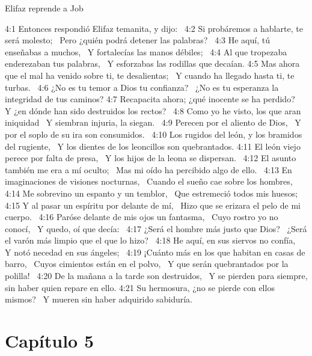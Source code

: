 Elifaz reprende a Job  

4:1 Entonces respondió Elifaz temanita, y dijo:  
4:2 Si probáremos a hablarte, te será molesto;  
Pero ¿quién podrá detener las palabras?  
4:3 He aquí, tú enseñabas a muchos,  
Y fortalecías las manos débiles;  
4:4 Al que tropezaba enderezaban tus palabras,  
Y esforzabas las rodillas que decaían. 
4:5 Mas ahora que el mal ha venido sobre ti, te desalientas;  
Y cuando ha llegado hasta ti, te turbas.  
4:6 ¿No es tu temor a Dios tu confianza?  
¿No es tu esperanza la integridad de tus caminos? 
4:7 Recapacita ahora; ¿qué inocente se ha perdido?  
Y ¿en dónde han sido destruidos los rectos?  
4:8 Como yo he visto, los que aran iniquidad  
Y siembran injuria, la siegan.  
4:9 Perecen por el aliento de Dios,  
Y por el soplo de su ira son consumidos.  
4:10 Los rugidos del león, y los bramidos del rugiente,  
Y los dientes de los leoncillos son quebrantados. 
4:11 El león viejo perece por falta de presa,  
Y los hijos de la leona se dispersan.  
4:12 El asunto también me era a mí oculto;  
Mas mi oído ha percibido algo de ello.  
4:13 En imaginaciones de visiones nocturnas,  
Cuando el sueño cae sobre los hombres,  
4:14 Me sobrevino un espanto y un temblor,  
Que estremeció todos mis huesos;  
4:15 Y al pasar un espíritu por delante de mí,  
Hizo que se erizara el pelo de mi cuerpo.  
4:16 Paróse delante de mis ojos un fantasma,  
Cuyo rostro yo no conocí,  
Y quedo, oí que decía:  
4:17 ¿Será el hombre más justo que Dios?  
¿Será el varón más limpio que el que lo hizo?  
4:18 He aquí, en sus siervos no confía,  
Y notó necedad en sus ángeles;  
4:19 ¡Cuánto más en los que habitan en casas de barro,  
Cuyos cimientos están en el polvo,  
Y que serán quebrantados por la polilla!  
4:20 De la mañana a la tarde son destruidos,  
Y se pierden para siempre, sin haber quien repare en ello. 
4:21 Su hermosura, ¿no se pierde con ellos mismos?  
Y mueren sin haber adquirido sabiduría.  
\section*{Capítulo 5} 


